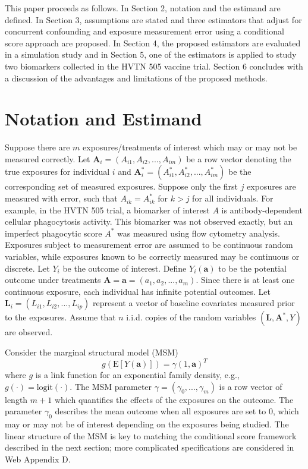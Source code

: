 \documentclass[useAMS,usenatbib,referee]{biom}
\begin{document}
This paper proceeds as follows. In Section 2, notation and the estimand are defined. In Section 3, assumptions are stated and three estimators that adjust for concurrent confounding and exposure measurement error using a conditional score approach are proposed. In Section 4, the proposed estimators are evaluated in a simulation study and in Section 5, one of the estimators is applied to study two biomarkers collected in the HVTN 505 vaccine trial. Section 6 concludes with a discussion of the advantages and limitations of the proposed methods.

\section{Notation and Estimand}
\label{s:notation}

Suppose there are $m$ exposures/treatments of interest which may or may not be measured correctly. Let $\bm{A}_{i} = (A_{i1}, A_{i2}, ..., A_{im})$ be a row vector denoting the true exposures for individual $i$ and $\bm{A}^{*}_{i} =  (A^{*}_{i1}, A^{*}_{i2}, ..., A^{*}_{im})$ be the corresponding set of measured exposures. Suppose only the first $j$ exposures are measured with error, such that $A_{ik} = A^{*}_{ik}$ for $k > j$ for all individuals. For example, in the HVTN 505 trial, a biomarker of interest $A$ is antibody-dependent cellular phagocytosis activity. This biomarker was not observed exactly, but an imperfect phagocytic score $A^{*}$ was measured using flow cytometry analysis. Exposures subject to measurement error are assumed to be continuous random variables, while exposures known to be correctly measured may be continuous or discrete. Let $Y_{i}$ be the outcome of interest. Define $Y_{i}(\bm{a})$ to be the potential outcome under treatments $\bm{A} = \bm{a} = (a_{1}, a_{2}, ..., a_{m})$. Since there is at least one continuous exposure, each individual has infinite potential outcomes. Let $\bm{L}_{i} =  (L_{i1}, L_{i2}, ..., L_{ip})$ represent a vector of baseline covariates measured prior to the exposures. Assume that $n$ i.i.d. copies of the random variables $(\bm{L}, \bm{A}^{*}, Y)$ are observed.

Consider the marginal structural model (MSM)
\begin{equation}
    g(\text{E}[Y(\bm{a})]) = \gamma (1, \bm{a})^{T}
\end{equation}
where $g$ is a link function for an exponential family density, e.g., $g(\cdot) = \text{logit}(\cdot)$. The MSM parameter $\gamma = (\gamma_{0}, ..., \gamma_{m})$ is a row vector of length $m+1$ which quantifies the effects of the exposures on the outcome. The parameter $\gamma_{0}$ describes the mean outcome when all exposures are set to 0, which may or may not be of interest depending on the exposures being studied. The linear structure of the MSM is key to matching the conditional score framework described in the next section; more complicated specifications are considered in Web Appendix D.
\end{document}
